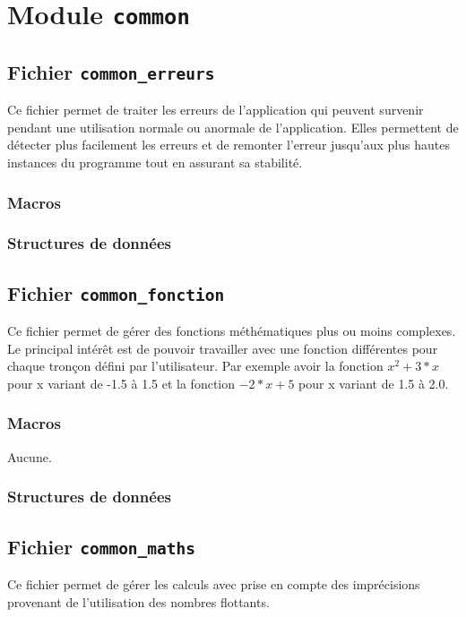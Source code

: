 \documentclass{article}
\begin{document}
\section{Module {\texttt{common}}}
\subsection{Fichier {\texttt{common\_erreurs}}}
Ce fichier permet de traiter les erreurs de l'application qui peuvent survenir pendant une utilisation normale ou anormale de l'application. Elles permettent de détecter plus facilement les erreurs et de remonter l'erreur jusqu'aux plus hautes instances du programme tout en assurant sa stabilité.
\subsubsection{Macros}

\subsubsection{Structures de données}
\subsection{Fichier {\texttt{common\_fonction}}}
Ce fichier permet de gérer des fonctions méthématiques plus ou moins complexes. Le principal intérêt est de pouvoir travailler avec une fonction différentes pour chaque tronçon défini par l'utilisateur. Par exemple avoir la fonction $x^2+3*x$ pour x variant de -1.5 à 1.5 et la fonction $-2*x+5$ pour x variant de 1.5 à 2.0.
\subsubsection{Macros}
Aucune.
\subsubsection{Structures de données}











\subsection{Fichier {\texttt{common\_maths}}}
Ce fichier permet de gérer les calculs avec prise en compte des imprécisions provenant de l'utilisation des nombres flottants.
\end{document}
